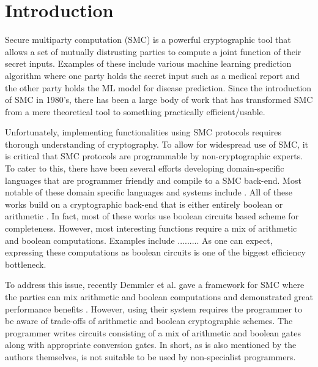 \section{Introduction}
\label{sec:intro}

Secure multiparty computation \cite{yao,gmw} (SMC) is a powerful cryptographic tool that allows a set of mutually distrusting parties to compute a joint function of their secret inputs. Examples of these include various machine learning prediction algorithm where one party holds the secret input such as a medical report and the other party holds the ML model for disease prediction. Since the introduction of SMC in 1980's, there has been a large body of work \cite{..} that has transformed SMC from a mere theoretical tool to something practically efficient/usable.

Unfortunately, implementing functionalities using SMC protocols requires thorough understanding of cryptography. To allow for widespread use of SMC, it is critical that SMC protocols are programmable by non-cryptographic experts. To cater to this, there have been several efforts developing domain-specific languages that are programmer friendly and compile to a SMC back-end. Most notable of these domain specific languages and systems include \cite{...}. All of these works build on a cryptographic back-end that is either entirely boolean \cite{yao,gmw} or arithmetic \cite{homo}. In fact, most of these works use boolean circuits based scheme for completeness. However, most interesting functions require a mix of arithmetic and boolean computations.  Examples include ......... As one can expect, expressing these computations as boolean circuits is one of the biggest efficiency bottleneck. 

To address this issue, recently Demmler et al. \cite{aby} gave a framework for SMC where the parties can mix arithmetic and boolean computations and demonstrated great performance benefits . However, using their system requires the programmer to be aware of trade-offs of arithmetic and boolean cryptographic schemes. The programmer writes circuits consisting of a mix of arithmetic and boolean gates along with appropriate conversion gates. In short, as is also mentioned by the authors themselves, \cite{aby} is not suitable to be used by non-specialist programmers.


